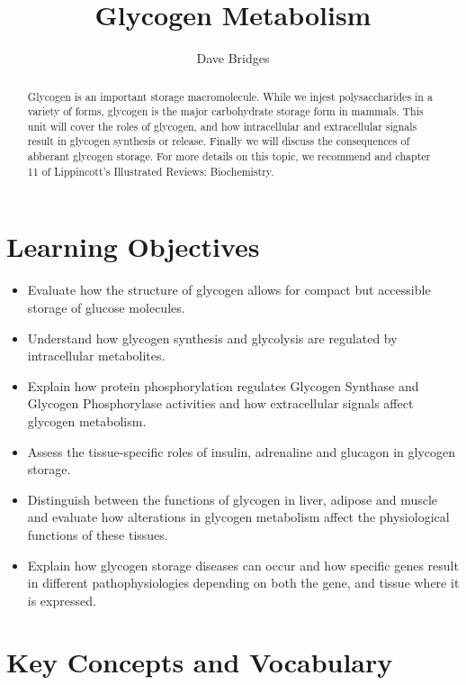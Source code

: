 \documentclass{tufte-handout}
\title{Glycogen Metabolism}
\author{Dave Bridges}
\date{}  %
\begin{document}
\maketitle%

\begin{abstract}
\noindent Glycogen is an important storage macromolecule.  While we injest polysaccharides in a variety of forms, glycogen is the major carbohydrate storage form in mammals.  This unit will cover the roles of glycogen, and how intracellular and extracellular signals result in glycogen synthesis or release.  Finally we will discuss the consequences of abberant glycogen storage.  For more details on this topic, we recommend \citet{Bollen1998} and chapter 11 of Lippincott's Illustrated Reviews: Biochemistry\cite{Ferrier2017}.
\end{abstract}

\tableofcontents
\pagebreak
\section{Learning Objectives}

\begin{itemize}
\item Evaluate how the structure of glycogen allows for compact but accessible storage of glucose molecules.
\item Understand how glycogen synthesis and glycolysis are regulated by intracellular metabolites.
\item Explain how protein phosphorylation regulates Glycogen Synthase and Glycogen Phosphorylase activities and how extracellular signals affect glycogen metabolism.
\item Assess the tissue-specific roles of insulin, adrenaline and glucagon in glycogen storage.
\item Distinguish between the functions of glycogen in liver, adipose and muscle and evaluate how alterations in glycogen metabolism affect the physiological functions of these tissues.
\item Explain how glycogen storage diseases can occur and how specific genes result in different pathophysiologies depending on both the gene, and tissue where it is expressed.
\end{itemize}

\section{Key Concepts and Vocabulary}
\end{document}
